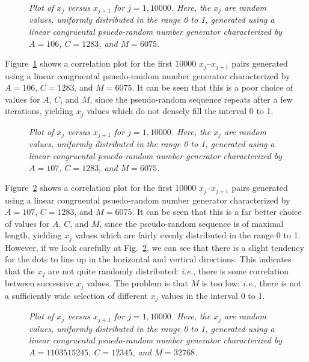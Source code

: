 \begin{figure}
\epsfysize=4in
\centerline{}
\caption{\em Plot of $x_j$ versus $x_{j+1}$ for $j=1,10000$. Here, the $x_j$
are random values, uniformly distributed in the range 0 to 1, generated
using a linear congruental psuedo-random number generator characterized by
$A=106$, $C=1283$, and $M=6075$.}\label{rand3}
\end{figure}

Figure~\ref{rand3} shows a correlation plot for the first 10000 $x_j$--$x_{j+1}$ pairs generated
using a linear congruental  psuedo-random number generator characterized by
$A=106$, $C=1283$, and $M=6075$. It can be seen that this is a
poor choice of values for
$A$, $C$, and $M$, since the pseudo-random sequence repeats after a few iterations, yielding
$x_j$ values which do not densely fill the interval 0 to 1.

\begin{figure}
\epsfysize=4in
\centerline{}
\caption{\em Plot of $x_j$ versus $x_{j+1}$ for $j=1,10000$. Here, the $x_j$
are random values, uniformly distributed in the range 0 to 1, generated
using a linear congruental psuedo-random number generator characterized by
$A=107$, $C=1283$, and $M=6075$.}\label{rand4}
\end{figure}

Figure~\ref{rand4} shows a correlation plot for the first 10000 $x_j$--$x_{j+1}$ pairs generated
using a linear congruental  psuedo-random number generator characterized by
$A=107$, $C=1283$, and $M=6075$. It can be seen that this is a
far better choice of values for
$A$, $C$, and $M$, since the pseudo-random sequence is of maximal length, yielding
$x_j$ values which are fairly evenly distributed in the range 0 to 1. However,
if we look carefully at Fig.~\ref{rand4}, we can see that there is a slight tendency for
the dots to line up in the horizontal and vertical directions. This indicates that the 
$x_j$ are not quite randomly distributed: {\em i.e.}, there is some correlation between
successive $x_j$ values. The problem is that $M$ is too low: {\em i.e.}, there is
not a sufficiently wide selection of different $x_j$ values in the interval 0 to 1.

\begin{figure}
\epsfysize=4in
\centerline{}
\caption{\em Plot of $x_j$ versus $x_{j+1}$ for $j=1,10000$. Here, the $x_j$
are random values, uniformly distributed in the range 0 to 1, generated
using a linear congruental psuedo-random number generator characterized by
$A=1103515245$, $C=12345$, and $M=32768$.}\label{rand1}
\end{figure}

